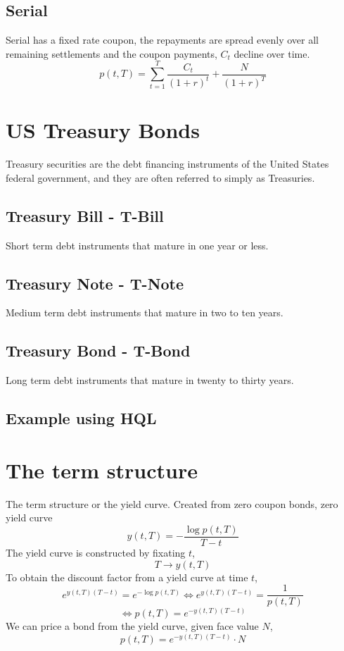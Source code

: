 \documentclass[11pt,a4paper]{article}
\numberwithin{equation}{section}
\begin{document}

\subsection{Serial}
Serial has a fixed rate coupon, the repayments are spread evenly over all remaining settlements and the coupon payments, $C_t$ decline
over time.
\[ p(t,T) = \sum_{t=1}^{T}\frac{C_t}{(1+r)^t} + \frac{N}{(1+r)^T} \]


\section{US Treasury Bonds}
Treasury securities are the debt financing instruments of the United States federal government, and they are often referred to simply as Treasuries.
\subsection{Treasury Bill - T-Bill}
Short term debt instruments that mature in one year or less.
\subsection{Treasury Note - T-Note}
Medium term debt instruments that mature in two to ten years.
\subsection{Treasury Bond - T-Bond}
Long term debt instruments that mature in twenty to thirty years.

\subsection{Example using HQL}

\section{The term structure}
The term structure or the yield curve.
Created from zero coupon bonds, zero yield curve
\[
y(t,T)=-\frac{\log{p(t,T)}}{T-t}
\]
The yield curve is constructed by fixating $t$,
\[
T\to y(t,T)
\]
To obtain the discount factor from a yield curve at time $t$,
\[
e^{y(t,T)(T-t)}=e^{-\log{p(t,T)}}\iff e^{y(t,T)(T-t)}=\frac{1}{p(t,T)}
\]
\[
\iff p(t,T)=e^{-y(t,T)(T-t)}
\]
We can price a bond from the yield curve, given face value $N$,
\[
p(t,T)=e^{-y(t,T)(T-t)}\cdot N
\]
\end{document}
